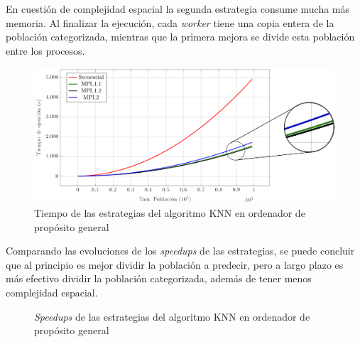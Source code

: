 			En cuestión de complejidad espacial la segunda estrategia consume mucha más memoria. Al finalizar la ejecución, cada \textit{worker} tiene una copia entera de la población categorizada, mientras que la primera mejora se divide esta población entre los procesos. 
			

			\begin{figure}[!h]
				\centering
				\includegraphics[width=1\textwidth]{images/chapter_4/knn_mpi}
				\caption{Tiempo de las estrategias del algoritmo KNN en ordenador de propósito general}
				\label{fig:knn_ordenador}
			\end{figure}
			
			
			Comparando las evoluciones de los \textit{speedups} de las estrategias, se puede concluir que al principio es mejor dividir la población a predecir, pero a largo plazo es más efectivo dividir la población categorizada, además de tener menos complejidad espacial. 
		
			\begin{figure} [!h]
				\centering
				\caption{\textit{Speedups} de las estrategias del algoritmo KNN en ordenador de propósito general}
			\end{figure}
			
